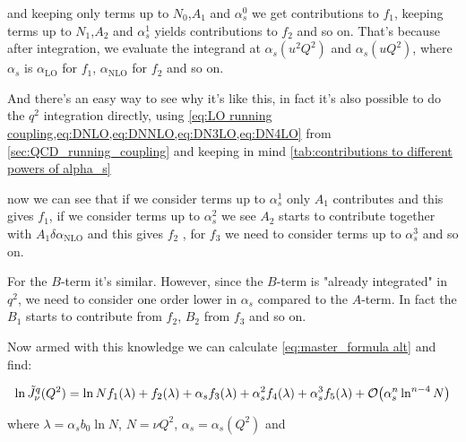 \documentclass[../main.tex]{subfiles}
\begin{document}
and keeping only terms up to $N_0$,$A_1$ and $\alpha_s^0$ we get contributions to $f_1$, keeping terms up to $N_1$,$A_2$ and $\alpha_s^1$ yields contributions to $f_2$ and so on. 
That's because after integration, we evaluate the integrand at $\alpha_s(u^2 Q^2)$ and $\alpha_s(u Q^2)$, where $\alpha_s$ is $\alpha_{\text{LO}}$ for $f_1$, $\alpha_{\text{NLO}}$ for $f_2$ and so on. 

And there's an easy way to see why it's like this, in fact it's also possible to do the $q^2$ integration directly, using \cref{eq:LO running coupling,eq:DNLO,eq:DNNLO,eq:DN3LO,eq:DN4LO} from \cref{sec:QCD_running_coupling}
and keeping in mind \cref{tab:contributions to different powers of alpha_s}


now we can see that if we consider terms up to $\alpha_s^1$ only $A_1$ contributes and this gives $f_1$, if we consider terms up to $\alpha_s^2$ we see $A_2$ starts to contribute together with $A_1  \delta\alpha_{\text{NLO}}$
and this gives $f_2$ , for $f_3$ we need to consider terms up to $\alpha_s^3$ and so on. 

For the $B$-term it's similar. However, since the $B$-term is "already integrated" in $q^2$, we need to consider one order lower in $\alpha_s$ compared to the $A$-term. In fact the $B_1$ starts to contribute from $f_2$, $B_2$ from $f_3$ and so on.  

Now armed with this knowledge we can calculate \cref{eq:master_formula alt} and find: 

\begingroup
\allowdisplaybreaks
\begin{equation}
    \ln \tilde{J}_\nu^q(Q^2) = \ln N f_1(\lambda) + f_2(\lambda) + \alpha_s f_3(\lambda) + \alpha_s^2 f_4(\lambda) + \alpha_s^3 f_5(\lambda) + \order{\alpha_s^n \ln^{n-4}N}
\end{equation}

where $\lambda = \alpha_s b_0 \ln N$, $N=\nu Q^2$, $\alpha_s = \alpha_s(Q^2)$ and


\end{document}

